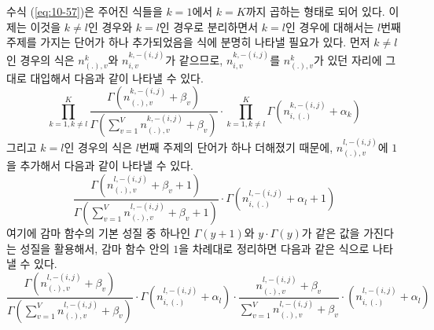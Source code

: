 \documentclass[a4paper]{oblivoir}
\begin{document}
수식 (\ref{eq:10-57})은 주어진 식들을 $k=1$에서 $k=K$까지 곱하는 형태로 되어 있다. 이제는 이것을 $k \neq l$인 경우와 $k=l$인 경우로 분리하면서 $k=l$인 경우에 대해서는 $l$번째 주제를 가지는 단어가 하나 추가되었음을 식에 분명히 나타낼 필요가 있다. 먼저 $k \neq l$인 경우의 식은 $n_{(.),v}^{k}$와 $n_{i,v}^{k,-(i,j)}$가 같으므로, $n_{i,v}^{k,-(i,j)}$를 $n_{(.),v}^{k}$가 있던 자리에 그대로 대입해서 다음과 같이 나타낼 수 있다. 
\begin{equation}
\prod_{k=1, k \neq l}^{K} \frac{\Gamma(n_{(.),v}^{k,-(i,j)}+\beta_{v})}{\Gamma(\sum_{v=1}^{V} n_{(.),v}^{k,-(i,j)}+\beta_{v})} \cdot \prod_{k=1, k \neq l}^{K} \Gamma(n^{k,-(i,j)}_{i,(.)}+\alpha_{k})
\label{eq:10-58}
\end{equation}
그리고 $k=l$인 경우의 식은 $l$번째 주제의 단어가 하나 더해졌기 때문에, $n_{(.),v}^{l,-(i,j)}$에 $1$을 추가해서 다음과 같이 나타낼 수 있다.
\begin{equation}
\frac{\Gamma(n_{(.),v}^{l,-(i,j)}+\beta_{v}+1)}{\Gamma(\sum_{v=1}^{V} n_{(.),v}^{l,-(i,j)}+\beta_{v}+1)} \cdot \Gamma(n^{l,-(i,j)}_{i,(.)}+\alpha_{l}+1)
\label{eq:10-59}
\end{equation} 
여기에 감마 함수의 기본 성질 중 하나인 $\Gamma(y+1)$와 $y \cdot \Gamma(y)$가 같은 값을 가진다는 성질을 활용해서, 감마 함수 안의 $1$을 차례대로 정리하면 다음과 같은 식으로 나타낼 수 있다.
\begin{equation}
\frac{\Gamma(n_{(.),v}^{l,-(i,j)}+\beta_{v})}{\Gamma(\sum_{v=1}^{V} n_{(.),v}^{l,-(i,j)}+\beta_{v})} \cdot \Gamma(n^{l,-(i,j)}_{i,(.)}+\alpha_{l}) \cdot \frac{n_{(.),v}^{l,-(i,j)}+\beta_{v}}{\sum_{v=1}^{V} n_{(.),v}^{l,-(i,j)}+\beta_{v}} \cdot (n^{l,-(i,j)}_{i,(.)}+\alpha_{l})
\label{eq:10-60}
\end{equation} 
\end{document}
